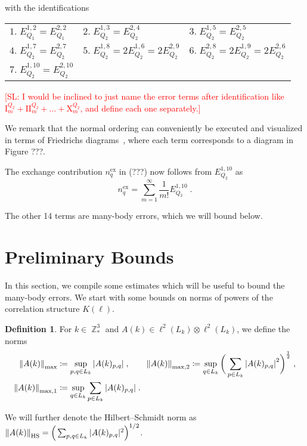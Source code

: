 \documentclass[12pt,a4paper]{article}
\numberwithin{equation}{section}
\newcommand{\1}{\mathbb{I}}
\newcommand{\ex}{\mathrm{ex}}
\newcommand{\HS}{\mathrm{HS}}
\DeclareMathOperator{\Z}{\mathbb{Z}}
\newcommand{\half}{\frac{1}{2}}
\theoremstyle{plain}
\theoremstyle{definition}
\newtheorem{definition}[theorem]{Definition}
\theoremstyle{remark}
\theoremstyle{plain}
\theoremstyle{definition}
\theoremstyle{remark}
\begin{document}
with the identifications\\
{\renewcommand{\arraystretch}{1.5}
	\begin{tabular}[t]{lll}
		 $\mathit{1.}\; E_{Q_1}^{1,2} = E_{Q_1}^{2,2}$\quad\quad& 
		 $\mathit{2.}\; E_{Q_2}^{1,3} = E_{Q_2}^{2,4}$\quad\quad&
		 $\mathit{3.}\; E_{Q_2}^{1,5} = E_{Q_2}^{2,5}$ \quad\quad\\
		 $\mathit{4.}\; E_{Q_2}^{1,7} = E_{Q_2}^{2,7}$\quad\quad&
		 $\mathit{5.}\; E_{Q_2}^{1,8} = 2E_{Q_2}^{1,6} =  2E_{Q_2}^{2,9}$\quad\quad&
		 $\mathit{6.}\; E_{Q_2}^{2,8} = 2E_{Q_2}^{1,9} = 2E_{Q_2}^{2,6}$\quad\quad\\
		 $\mathit{7.}\; E_{Q_2}^{1,10} = E_{Q_2}^{2,10}$\quad\quad
	 
\end{tabular}}

\textcolor{red}{[SL: I would be inclined to just name the error terms after identification like $ \mathrm{I}_m^{Q_2} + \mathrm{II}_m^{Q_2} + \ldots + \mathrm{X}_m^{Q_2} $, and define each one separately.]}

We remark that the normal ordering can conveniently be executed and visualized in terms of Friedrichs diagrams~\cite{BL23}, where each term corresponds to a diagram in Figure ???.



The exchange contribution $ n_q^{\ex} $ in (???) now follows from $ E_{Q_2}^{1,10} $ as
\begin{equation}
	n_q^{\ex}
	= \sum_{m=1}^\infty \frac{1}{m!} E_{Q_2}^{1,10} \;.
\end{equation}

The other 14 terms are many-body errors, which we will bound below.



\section{Preliminary Bounds}
\label{sec:prelim_bounds}

In this section, we compile some estimates which will be useful to bound the many-body errors. We start with some bounds on norms of powers of the correlation structure $ K(\ell) $.

\begin{definition}
For $k \in \Z^3_*$ and $A(k)\in \ell^2(L_k)\otimes \ell^2(L_k)$, we define the norms
\begin{equation}
\begin{aligned}
	\norm{A(k)}_{\max}
	&\coloneq \sup\limits_{p,q \in L_k}\abs{A(k)_{p,q}} \;, \qquad
	\norm{A(k)}_{\max,2}
	\coloneq \sup\limits_{q \in L_k}\bigg(\sum\limits_{p \in L_k}\abs{A(k)_{p,q}}^2\bigg)^\half \;, \\
	\norm{A(k)}_{\mathrm{max,1}}
	&\coloneq \sup\limits_{q \in L_k}\sum\limits_{p \in L_k}\abs{A(k)_{p,q}} \;.
\end{aligned}
\end{equation}
\end{definition}
We will further denote the Hilbert--Schmidt norm as $ \norm{A(k)}_{\HS} = \Big( \sum_{p,q \in L_k} |A(k)_{p,q}|^2 \Big)^{1/2} $.
\end{document}
